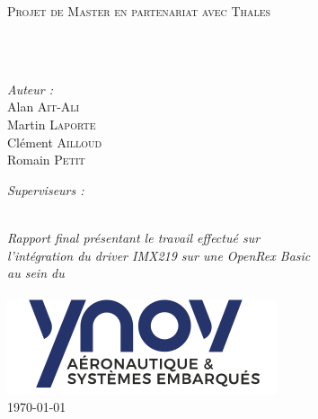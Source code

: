 \begin{titlepage}
	\begin{center}

		\vspace*{.06\textheight}
		{\scshape\LARGE \univname\par}\vspace{1.5cm} %
		\textsc{\Large Projet de Master en partenariat avec Thales}\\[0.5cm] %

		\HRule \\[0.4cm] %
		{\huge \bfseries \ttitle\par}\vspace{0.4cm} %
		\HRule \\[1.5cm] %

		\begin{minipage}[t]{0.4\textwidth}
			\begin{flushleft} \large
				\emph{Auteur :}\\
				Alan \textsc{Ait-Ali} \\
				Martin \textsc{Laporte} \\
				Clément \textsc{Ailloud} \\
				Romain \textsc{Petit}
			\end{flushleft}
		\end{minipage}
		\begin{minipage}[t]{0.4\textwidth}
			\begin{flushright} \large
				\emph{Superviseurs :} \\
				\supname %
			\end{flushright}
			\end{minipage}\\[3cm]

			\large \textit{Rapport final présentant le travail effectué sur \\
			l'intégration du driver IMX219 sur une OpenRex Basic}\\[0.3cm] %
			\textit{au sein du}\\[0.4cm]
			\deptname\\[2cm] %

			\includegraphics[scale=0.7]{Figures/Logo_Ynov.png}\\[1cm] %

			{\large \today}\\[4cm] %


			\vfill
		\end{center}
	\end{titlepage}

